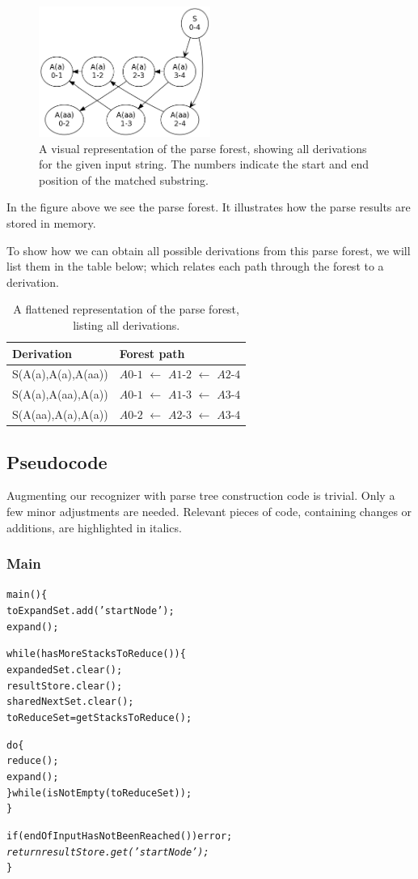 \documentclass[a4paper,10pt]{article}
\begin{document}
\begin{figure}[H]
\centering
\includegraphics[width=0.5\textwidth]{a_aa-forest.png}
\caption{A visual representation of the parse forest, showing all derivations for the given input string. The numbers indicate the start and end position of the matched substring.}
\end{figure}

In the figure above we see the parse forest. It illustrates how the parse results are stored in memory.

To show how we can obtain all possible derivations from this parse forest, we will list them in the table below; which relates each path through the forest to a derivation.

\begin{table}[H]
\centering
\begin{tabular}{ p{15em} p{15em} }
Derivation & Forest path\\
\hline
S(A(a),A(a),A(aa)) & $A0$-$1$ $\leftarrow$ $A1$-$2$ $\leftarrow$ $A2$-$4$\\
S(A(a),A(aa),A(a)) & $A0$-$1$ $\leftarrow$ $A1$-$3$ $\leftarrow$ $A3$-$4$\\
S(A(aa),A(a),A(a)) & $A0$-$2$ $\leftarrow$ $A2$-$3$ $\leftarrow$ $A3$-$4$
\end{tabular}
\caption{A flattened representation of the parse forest, listing all derivations.}
\end{table}

\pagebreak
\subsection{Pseudocode}

Augmenting our recognizer with parse tree construction code is trivial. Only a few minor adjustments are needed. Relevant pieces of code, containing changes or additions, are highlighted in italics.

\subsubsection{Main}
{\small
\begin{alltt}
main()\{
  toExpandSet.add('startNode');
  expand();
  
  while(hasMoreStacksToReduce())\{
    expandedSet.clear();
    resultStore.clear();
    sharedNextSet.clear();
    toReduceSet = getStacksToReduce();
    
    do\{
       reduce();
       expand();
    \}while(isNotEmpty(toReduceSet));
  \}
  
  if(endOfInputHasNotBeenReached()) error;
  \textit{
  return resultStore.get('startNode');}
\}
\end{alltt}
}
\end{document}
